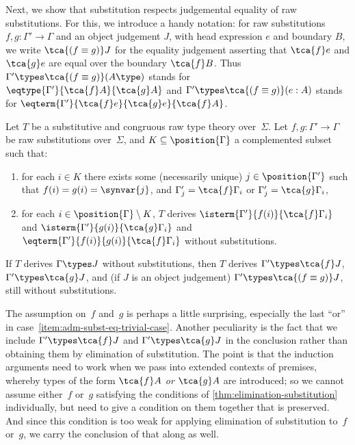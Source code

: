 Next, we show that substitution respects judgemental equality of raw substitutions.
%
For this, we introduce a handy notation: for raw substitutions $f, g : \Gamma' \to \Gamma$ and an object judgement $J$, with head expression $e$ and boundary $B$, we write $\tca{(f \equiv g)} J$ for the equality judgement asserting that $\tca{f} e$ and $\tca{g} e$ are equal over the boundary $\tca{f} B$. Thus $\Gamma' \types \tca{(f \equiv g)} (A \type)$ stands for $\eqtype{\Gamma'}{\tca{f} A}{\tca{g} A}$ and $\Gamma' \types \tca{(f \equiv g)} (e : A)$ stands for $\eqterm{\Gamma'}{\tca{f} e}{\tca{g} e}{\tca{f} A}$.

\begin{lemma}
  \label{lem:admissibility-equality-substitution}
  Let $T$ be a substitutive and congruous raw type theory over~$\Sigma$.
  Let $f, g : \Gamma' \to \Gamma$ be raw substitutions over~$\Sigma$,
  and $K \subseteq \position{\Gamma}$ a complemented subset such that:
  \begin{enumerate}

  \item \label{item:adm-subst-eq-trivial-case}%
    for each $i \in K$ there exists some (necessarily unique) $j \in \position{\Gamma'}$ such that
    $f(i) = g(i) = \synvar{j}$, and $\Gamma'_j = \tca{f} \Gamma_i$ or $\Gamma'_j = \tca{g} \Gamma_i$,

  \item \label{item:adm-subst-eq-nontrivial-case}%
    for each $i \in \position{\Gamma} \setminus K$,
    $T$ derives $\isterm{\Gamma'}{f(i)}{ \tca{f} \Gamma_i}$ and $\isterm{\Gamma'}{g(i)}{\tca{g} \Gamma_i}$ and $\eqterm{\Gamma'}{f(i)}{g(i)}{\tca{f} \Gamma_i}$ without substitutions.
  \end{enumerate}
  If $T$ derives $\Gamma \types J$ without substitutions, then $T$ derives $\Gamma' \types \tca{f} J$, $\Gamma' \types \tca{g} J$, and (if $J$ is an object judgement) $\Gamma' \types \tca{(f \equiv g)} J$, still without substitutions.
\end{lemma}

The assumption on~$f$ and~$g$ is perhaps a little surprising, especially the last ``or'' in case~\eqref{item:adm-subst-eq-trivial-case}. Another peculiarity is the fact that we include $\Gamma' \types \tca{f} J$ and $\Gamma' \types \tca{g} J$ in the conclusion rather than obtaining them by elimination of substitution.
%
The point is that the induction arguments need to work when we pass into extended contexts of premises, whereby types of the form $\tca{f} A$ \emph{or} $\tca{g} A$ are introduced; so we cannot assume either~$f$ or~$g$ satisfying the conditions of \cref{thm:elimination-substitution} individually, but need to give a condition on them together that is preserved.
%
And since this condition is too weak for applying elimination of substitution to~$f$ or~$g$, we carry the conclusion of that along as well.

